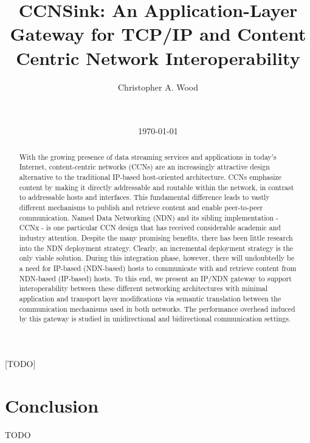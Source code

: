 \documentclass{sigcomm}
\begin{document}
\title{CCNSink: An Application-Layer Gateway for TCP/IP and Content Centric Network Interoperability}

\author{
\alignauthor
Christopher A. Wood\\ %
       \\
       \\
}

\date{\today}

\maketitle
\begin{abstract}
With the growing presence of data streaming services and applications in today's Internet, content-centric networks (CCNs) are an increasingly attractive design alternative to the traditional IP-based host-oriented architecture. CCNs emphasize content by making it directly addressable and routable within the network, in contrast to addressable hosts and interfaces. This fundamental difference leads to vastly different mechanisms to publish and retrieve content and enable peer-to-peer communication. Named Data Networking (NDN) and its sibling implementation - CCNx - is one particular CCN design that has received considerable academic and industry attention. Despite the many promising benefits, there has been little research into the NDN deployment strategy. Clearly, an incremental deployment strategy is the only viable solution. During this integration phase, however, there will undoubtedly be a need for IP-based (NDN-based) hosts to communicate with and retrieve content from NDN-based (IP-based) hosts. To this end, we present an IP/NDN gateway to support interoperability between these different networking architectures with minimal application and transport layer modifications via semantic translation between the communication mechanisms used in both networks. The performance overhead induced by this gateway is studied in unidirectional and bidirectional communication settings.
\end{abstract}

[TODO]









\section{Conclusion}
TODO



\end{document}
